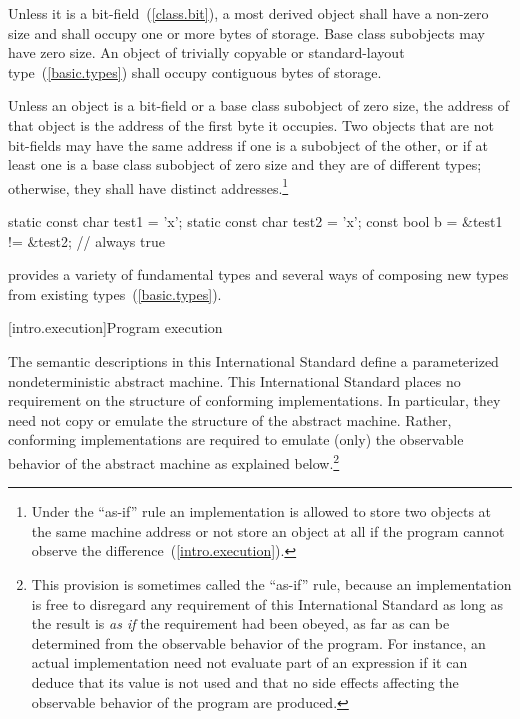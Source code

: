 \pnum
{}%
Unless it is a bit-field~(\ref{class.bit}), a most derived object shall have a
non-zero size and shall occupy one or more bytes of storage. Base class
subobjects may have zero size. An object of trivially copyable or
standard-layout type~(\ref{basic.types}) shall occupy contiguous bytes of
storage.

\pnum
{}%
%
Unless an object is a bit-field or a base class subobject of zero size, the
address of that object is the address of the first byte it occupies. Two
objects that are not bit-fields
may have the same address if one is a subobject of the other, or if at least
one is a base class subobject of zero size and they are of different types;
otherwise, they shall have distinct addresses.\footnote{Under the ``as-if'' rule an
implementation is allowed to store two objects at the same machine address or
not store an object at all if the program cannot observe the
difference~(\ref{intro.execution}).}

\enterexample
\begin{codeblock}
static const char test1 = 'x';
static const char test2 = 'x';
const bool b = &test1 != &test2;      // always true
\end{codeblock}
\exitexample

\pnum
\enternote 
\Cpp  provides a variety of fundamental types and several ways of composing
new types from existing types~(\ref{basic.types}).
\exitnote%

[intro.execution]{Program execution}

\pnum
{}%
%
The semantic descriptions in this International Standard define a
parameterized nondeterministic abstract machine. This International
Standard places no requirement on the structure of conforming
implementations. In particular, they need not copy or emulate the
structure of the abstract machine.
%
%
Rather, conforming implementations are required to emulate (only) the observable
behavior of the abstract machine as explained below.\footnote{This provision is
sometimes called the ``as-if'' rule, because an implementation is free to
disregard any requirement of this International Standard as long as the result
is \emph{as if} the requirement had been obeyed, as far as can be determined
from the observable behavior of the program. For instance, an actual
implementation need not evaluate part of an expression if it can deduce that its
value is not used and that no
%
side effects affecting the
observable behavior of the program are produced.}


